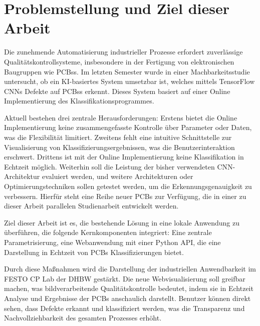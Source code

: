 \chapter{Problemstellung und Ziel dieser Arbeit} \label{chap:problemstellung_und_ziel_dieser_arbeit}

Die zunehmende Automatisierung industrieller Prozesse erfordert zuverlässige Qualitätskontrollsysteme, insbesondere in der Fertigung von elektronischen Baugruppen wie \acp{PCB}s. Im letzten Semester wurde in einer Machbarkeitsstudie untersucht, ob ein KI-basiertes System umsetzbar ist, welches mittels TensorFlow \acp{CNN} 
Defekte auf \acp{PCB}s erkennt. Dieses System basiert auf einer Online Implementierung des Klassifikationsprogrammes. 

Aktuell bestehen drei zentrale Herausforderungen: Erstens bietet die Online Implementierung keine zusammengefasste Kontrolle über Parameter oder Daten, was die Flexibilität limitiert. Zweitens fehlt eine intuitive Schnittstelle zur Visualisierung von 
Klassifizierungsergebnissen, was die Benutzerinteraktion erschwert. Drittens ist mit der Online Implementierung keine Klassifikation in Echtzeit möglich. 
Weiterhin soll die Leistung der bisher verwendeten \ac{CNN}-Architektur evaluiert werden, und weitere Architekturen oder Optimierungstechniken sollen getestet werden, um die Erkennungsgenauigkeit zu verbessern. 
Hierfür steht eine Reihe neuer \ac{PCB}s zur Verfügung, die in einer zu dieser Arbeit parallelen Studienarbeit entwickelt werden.

Ziel dieser Arbeit ist es, die bestehende Lösung in eine lokale Anwendung zu überführen, die folgende Kernkomponenten integriert: Eine zentrale Parametrisierung, eine Webanwendung mit einer Python \ac{API}, die eine Darstellung in Echtzeit von \acp{PCB} Klassifizierungen bietet. 

Durch diese Maßnahmen wird die Darstellung der industriellen Anwendbarkeit im FESTO CP Lab der \ac{DHBW} gestärkt. 
Die neue Webvisualisierung soll greifbar machen, was bildverarbeitende Qualitätskontrolle bedeutet, indem sie in Echtzeit Analyse und Ergebnisse der \acp{PCB} anschaulich darstellt. Benutzer können direkt sehen, dass Defekte erkannt und klassifiziert werden, was die Transparenz und Nachvollziehbarkeit des gesamten Prozesses erhöht.
